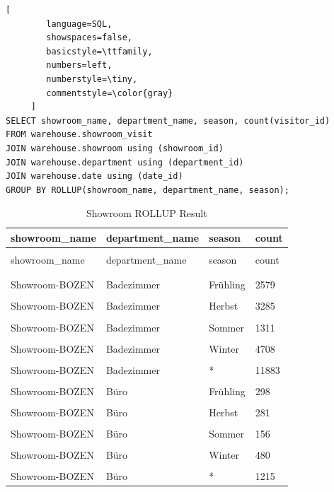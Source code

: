 \documentclass[letterpaper,12pt]{article}
\begin{document}
\begin{lstlisting}[
        language=SQL,
        showspaces=false,
        basicstyle=\ttfamily,
        numbers=left,
        numberstyle=\tiny,
        commentstyle=\color{gray}
     ]
SELECT showroom_name, department_name, season, count(visitor_id)
FROM warehouse.showroom_visit
JOIN warehouse.showroom using (showroom_id)
JOIN warehouse.department using (department_id)
JOIN warehouse.date using (date_id)
GROUP BY ROLLUP(showroom_name, department_name, season);
\end{lstlisting}


\begingroup
\renewcommand\arraystretch{0.5}
\begin{longtable}{p{4cm}p{4cm}p{3cm}p{2cm}}
        \caption{Showroom ROLLUP Result} \\
	showroom\_name & department\_name & season & count \\
        \endfirsthead \\
        showroom\_name & department\_name & season & count \\
        \endhead \\
        \hline \\
	Showroom-BOZEN & Badezimmer & Frühling & 2579 \\
        \hline \\
        Showroom-BOZEN & Badezimmer & Herbst & 3285 \\
        \hline \\
        Showroom-BOZEN & Badezimmer & Sommer & 1311 \\
        \hline \\
        Showroom-BOZEN & Badezimmer & Winter & 4708 \\
        \hline \\
        Showroom-BOZEN & Badezimmer & * & 11883 \\
        \hline \\
        Showroom-BOZEN & Büro & Frühling & 298 \\
        \hline \\
        Showroom-BOZEN & Büro & Herbst & 281 \\
        \hline \\
        Showroom-BOZEN & Büro & Sommer & 156 \\
        \hline \\
        Showroom-BOZEN & Büro & Winter & 480 \\
        \hline \\
        Showroom-BOZEN & Büro & * & 1215 \\

\end{longtable}
\end{document}
